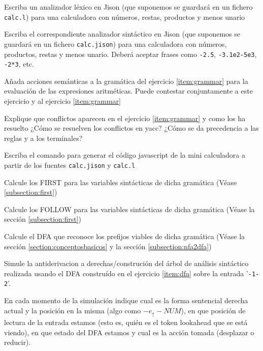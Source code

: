 
\item
Escriba un analizador léxico en Jison 
(que suponemos se guardará en un fichero \verb|calc.l|) 
para una calculadora con números, restas, productos y menos unario

\item
\label{item:grammar}
Escriba el correspondiente analizador sintáctico en Jison 
(que suponemos se guardará en un fichero \verb|calc.jison|) 
para una calculadora con números, productos, restas y menos unario.
Deberá aceptar frases como \verb|-2.5|, \verb|-3.1e2-5e3|, \verb|-2*3|,
etc.


\item
Añada acciones semánticas a 
la gramática del ejercicio 
\ref{item:grammar}
para la evaluación de las expresiones
aritméticas. Puede contestar conjuntamente a este ejercicio 
y al ejercicio \ref{item:grammar} 

\item 
Explique que conflictos aparecen en el 
ejercicio
\ref{item:grammar} y como los ha resuelto
¿Cómo se resuelven los conflictos en yacc?
¿Cómo se da precedencia a las reglas y a los terminales?

\item 
Escriba el comando para generar el código javascript de la mini
calculadora a partir de los fuentes \verb|calc.jison| y
\verb|calc.l|

\item 
Calcule los FIRST para las variables sintácticas de dicha gramática
(Véase 
\ref{subsection:first})
\item 
Calcule los FOLLOW  para las variables sintácticas de dicha gramática
(Véase la sección
\ref{subsection:first})

\item
\label{item:dfa}
Calcule el DFA que reconoce los prefijos viables de dicha gramática
(Véase la sección 
\ref{section:conceptosbasicos}
y la sección
\ref{subsection:nfa2dfa})
\item 
Simule la antiderivacion a derechas/construción del árbol de análisis sintáctico
realizada usando el DFA construído en el ejercicio 
\ref{item:dfa}
sobre la 
entrada
'\verb|-1-2|'.

En cada momento de la simulación indique cual es la forma sentencial derecha actual y 
la posición en la misma (algo como $-e_\uparrow - NUM$),
en que posición de lectura de la entrada estamos 
(esto es, quién es el token lookahead que se está viendo), en que estado
del DFA estamos y cual es la acción tomada (desplazar o reducir).

